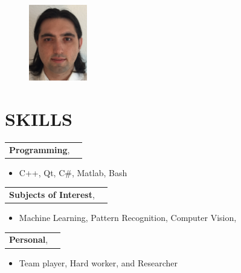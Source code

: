 \documentclass[margin]{res}
\begin{document}
  
	
	\address{Bordenbergweg Str. 64367, M\"uhltal\\
		\hspace{.5in}+49 176 62 01 37 66\\
		\hspace{.55in}csari@cihansari.com}
	\begin{resume}
		
		\begin{figure}
			\vspace{-1in}
			\includegraphics[width=1in]{me.jpg}
		\end{figure}
		
		\vspace{.5in}
		\section{SKILLS} 
		\begin{tabular}{p{2in} r}
			{\bf Programming},
		\end{tabular}	
		\begin{itemize}
			\item[] C++, Qt, C\#, Matlab, Bash
		\end{itemize} 
		
		\begin{tabular}{p{2in} r}
			{\bf Subjects of Interest},
		\end{tabular}	
		\begin{itemize}
			\item[] Machine Learning, Pattern Recognition, Computer Vision,
		\end{itemize} 
		
		\begin{tabular}{p{2in} r}
			{\bf Personal},
		\end{tabular}	
		\begin{itemize}
			\item[] Team player, Hard worker, and Researcher
		\end{itemize}
		

\end{resume}
\end{document}

